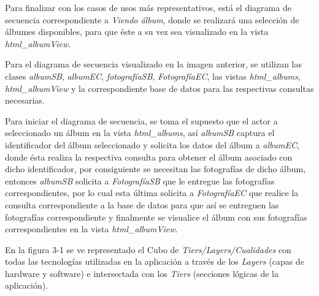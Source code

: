 \documentclass{memoria}
\begin{document}
Para finalizar con los casos de usos más representativos, está el diagrama de secuencia correspondiente a \textsl{Viendo álbum}, donde se realizará una selección de álbumes disponibles, para que éste a su vez sea visualizado en la vista \textsl{html\_albumView}.

Para el diagrama de secuencia visualizado en la imagen anterior, se utilizan las clases \textsl{albumSB}, \textsl{albumEC}, \textsl{fotografíaSB}, \textsl{FotografíaEC}, las vistas \textsl{html\_albums}, \textsl{html\_albumView} y la correspondiente base de datos para las respectivas consultas necesarias.

Para iniciar el diagrama de secuencia, se toma el supuesto que el actor a seleccionado un álbum en la vista \textsl{html\_albums}, así \textsl{albumSB} captura el identificador del álbum seleccionado y solicita los datos del álbum a \textsl{albumEC}, donde ésta realiza la respectiva consulta para obtener el álbum asociado con dicho identificador, por consiguiente se necesitan las fotografías de dicho álbum, entonces \textsl{albumSB} solicita a \textsl{FotografíaSB} que le entregue las fotografías correspondientes, por lo cual esta última solicita a \textsl{FotografíaEC} que realice la consulta correspondiente a la base de datos para que así se entreguen las fotografías correspondiente y finalmente se visualice el álbum con sus fotografías correspondientes en la vista \textsl{html\_albumView}.




En la figura 3-1 se ve representado el Cubo de \textsl{Tiers/Layers/Cualidades} con todas las tecnologías utilizadas en la aplicación a través de los \textsl{Layers} (capas de hardware y software) e intersectada con los \textsl{Tiers} (secciones lógicas de la aplicación).
\end{document}
